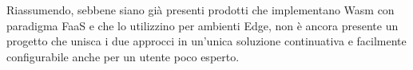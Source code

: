 Riassumendo, sebbene siano già presenti prodotti che implementano Wasm con paradigma FaaS e che lo utilizzino per ambienti Edge, non è ancora presente un progetto che unisca i due approcci in un'unica soluzione continuativa e facilmente configurabile anche per un utente poco esperto.
%